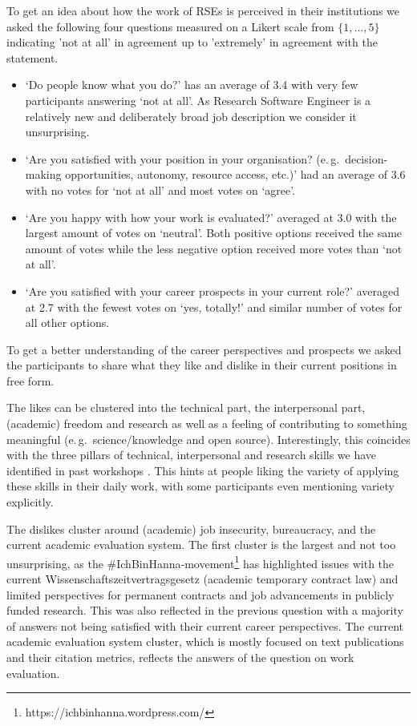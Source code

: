 \documentclass{eceasst}
\begin{document}
To get an idea about how the work of RSEs is perceived in their institutions we asked the following four questions measured on a Likert scale from $\{1,\dots,5\}$ indicating 'not at all' in agreement up to 'extremely' in agreement with the statement.
\begin{itemize}
  \item
    `Do people know what you do?' has an average of 3.4 with very few participants answering `not at all'.
    As Research Software Engineer is a relatively new and deliberately broad job description we consider it unsurprising.
  \item
    `Are you satisfied with your position in your organisation? (e.\,g.\, decision-making opportunities, autonomy, resource access, etc.)' 
    had an average of 3.6 with no votes for `not at all' and most votes on `agree'.
  \item 
    `Are you happy with how your work is evaluated?' averaged at 3.0 with the largest amount of votes on `neutral'. 
    Both positive options received the same amount of votes while the less negative option received more votes than `not at all'.
  \item 
    `Are you satisfied with your career prospects in your current role?' averaged at 2.7 with the fewest votes on `yes, totally!' 
    and similar number of votes for all other options.
\end{itemize}


To get a better understanding of the career perspectives and prospects
we asked the participants to share what they like and dislike in their current positions
in free form.

The likes can be clustered into the technical part, the interpersonal part, (academic) freedom and research as well as a feeling of
contributing to something meaningful (e.\,g.\, science/knowledge and open source).
Interestingly, this coincides with the three pillars of technical, interpersonal and research skills we have identified in past workshops \cite{Goth:2025}.
This hints at people liking the variety of applying these skills in their daily work, with some participants even mentioning
variety explicitly.

The dislikes cluster around (academic) job insecurity, bureaucracy, and the current academic evaluation system.
The first cluster is the largest and not too unsurprising, as the \#IchBinHanna-movement\footnote{https://ichbinhanna.wordpress.com/} has highlighted
issues with the current Wissenschaftszeitvertragsgesetz (academic temporary contract law) and limited
perspectives for permanent contracts and job advancements in publicly funded research. 
This was also reflected in the previous question with a majority of answers not being satisfied with their current career perspectives.
The current academic evaluation system cluster, which is mostly focused on text publications and their citation metrics,
reflects the answers of the question on work evaluation.
\end{document}
